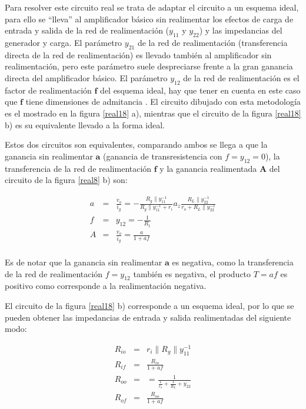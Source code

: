 Para resolver este circuito real se trata de adaptar el circuito a
un esquema ideal, para ello se ``lleva'' al amplificador básico sin
realimentar los efectos de carga de entrada y salida de la red de
realimentación ($y_{11}$ y $y_{22}$) y las impedancias del generador
y carga. El parámetro $y_{21}$ de la red de realimentación
(transferencia directa de la red de realimentación) es llevado
también al amplificador sin realimentación, pero este parámetro
suele despreciarse frente a la gran ganancia directa del
amplificador básico. El parámetro $y_{12}$ de la red de
realimentación es el factor de realimentación $\textbf{f}$ del
esquema ideal, hay que tener en cuenta en este caso que $\textbf{f}$
tiene dimensiones de admitancia . El circuito dibujado con esta
metodología es el mostrado en la figura \ref{real18} a), mientras
que el circuito de la figura \ref{real18} b) es su equivalente
llevado a la forma ideal.

Estos dos circuitos son equivalentes, comparando ambos se llega a
que la ganancia sin realimentar $\textbf{a}$ (ganancia de transresistencia con $f=y_{12}=0$), la transferencia de la red de realimentación $\textbf{f}$ y la ganancia realimentada $\textbf{A}$ del circuito de la figura \ref{real8} b) son:

\begin{eqnarray*}
	a &=& \frac{\displaystyle v_o}{\displaystyle i_g}=-\frac{\displaystyle R_g\parallel y_{11}^{-1}}{\displaystyle R_g\parallel y_{11}^{-1}+r_i} a_z \frac{\displaystyle R_L\parallel y_{22}^{-1}}{\displaystyle r_o+R_L\parallel y_{22}^{-1}}\\
	f &=& y_{12} = -\frac{\displaystyle 1}{\displaystyle R_1} \\
	A &=& \frac{\displaystyle v_o}{\displaystyle i_g} = \frac{\displaystyle a}{\displaystyle 1+af} \\
\end{eqnarray*}

Es de notar que la ganancia sin realimentar $\textbf{a}$ es
negativa, como la transferencia de la red de realimentación
$f=y_{12}$ también es negativa, el producto $T=af$ es positivo como
corresponde a la realimentación negativa.

El circuito de la figura \ref{real18} b) corresponde a un esquema
ideal, por lo que se pueden obtener las impedancias de entrada y
salida realimentadas del siguiente modo:

\begin{eqnarray*}
	R_{io} &=& r_i\parallel R_g\parallel y_{11}^{-1}\\
	R_{if} &=& \frac{\displaystyle R_{io}}{\displaystyle 1+af}\\
	R_{oo} &=& = \frac{\displaystyle 1}{\displaystyle \frac{\displaystyle 1}{\displaystyle r_o}+\frac{\displaystyle 1}{\displaystyle R_L}+y_{22}} \\
	R_{of} &=& \frac{\displaystyle R_{oo}}{\displaystyle 1+af}\\
\end{eqnarray*}


